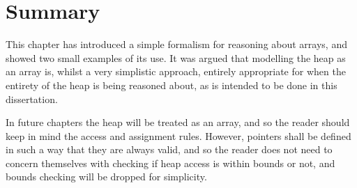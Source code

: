 \section{Summary}
\label{sec:heap-summary}

This chapter has introduced a simple formalism for reasoning about
arrays, and showed two small examples of its use. It was argued that
modelling the heap as an array is, whilst a very simplistic approach,
entirely appropriate for when the entirety of the heap is being
reasoned about, as is intended to be done in this dissertation.

In future chapters the heap will be treated as an array, and so the
reader should keep in mind the access and assignment rules. However,
pointers shall be defined in such a way that they are always valid,
and so the reader does not need to concern themselves with checking if
heap access is within bounds or not, and bounds checking will be
dropped for simplicity.
